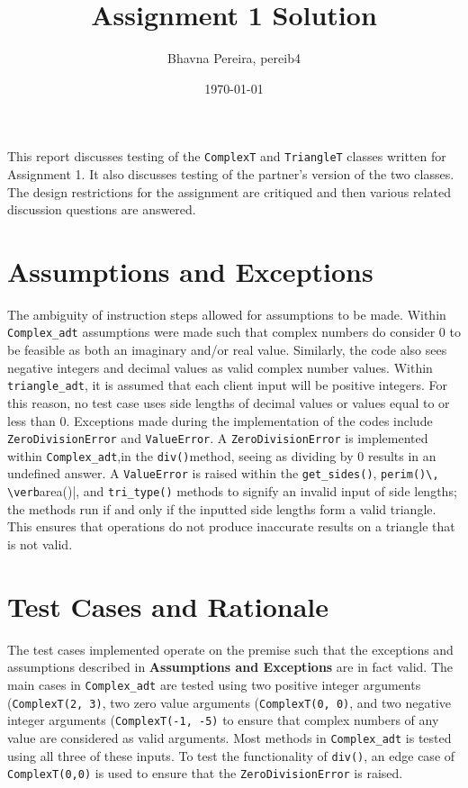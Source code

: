 \documentclass[12pt]{article}
\title{Assignment 1 Solution}
\author{Bhavna Pereira, pereib4}
\date{\today}
\begin{document}
\maketitle

This report discusses testing of the \verb|ComplexT| and \verb|TriangleT|
classes written for Assignment 1. It also discusses testing of the partner's
version of the two classes. The design restrictions for the assignment
are critiqued and then various related discussion questions are answered.

\section{Assumptions and Exceptions} \label{AssumptAndExcept}

The ambiguity of instruction steps allowed for assumptions to be made. Within \verb|Complex_adt| assumptions were made such that complex numbers do consider 0 to be feasible as both an imaginary and/or real value. Similarly, the code also sees negative integers and decimal values as valid complex number values. Within \verb|triangle_adt|, it is assumed that each client input will be positive integers. For this reason, no test case uses side lengths of decimal values or values equal to or less than 0. Exceptions made during the implementation of the codes include \verb|ZeroDivisionError| and \verb|ValueError|. A \verb|ZeroDivisionError| is implemented within \verb|Complex_adt|,in the \verb|div()|method, seeing as dividing by 0 results in an undefined answer. A \verb|ValueError| is raised within the \verb|get_sides()|, \verb|perim()\, \verb|area()|, and \verb|tri_type()| methods to signify an invalid input of side lengths; the methods run if and only if the inputted side lengths form a valid triangle. This ensures that operations do not produce inaccurate results on a triangle that is not valid. 


\section{Test Cases and Rationale} \label{Testing}

The test cases implemented operate on the premise such that the exceptions and assumptions described in \textbf{Assumptions and Exceptions} are in fact valid. The main cases in \verb|Complex_adt| are tested using two positive integer arguments (\verb|ComplexT(2, 3)|, two zero value arguments (\verb|ComplexT(0, 0)|, and two negative integer arguments (\verb|ComplexT(-1, -5)| to ensure that complex numbers of any value are considered as valid arguments. Most methods in \verb|Complex_adt| is tested using all three of these inputs. To test the functionality of \verb|div()|, an edge case of \verb|ComplexT(0,0)| is used to ensure that the \verb|ZeroDivisionError| is raised.
\end{document}
